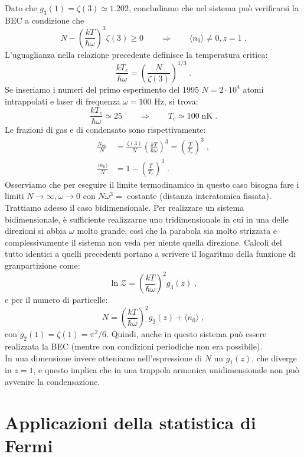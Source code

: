 \documentclass[10pt,a4paper]{report}
\theoremstyle{definition}
\numberwithin{equation}{section}
\newcommand{\bra}{\langle}
\newcommand{\ket}{\rangle}
\newcommand{\zpart}{\mathcal{Z}}
\begin{document}
Dato che $g_3(1)=\zeta(3)\simeq 1.202$, concludiamo che nel sistema può verificarsi la BEC a condizione che
\begin{equation}
N-\left(\frac{kT}{\hbar\omega}\right)^3\zeta(3)\ge 0 \qquad \Longrightarrow\qquad \bra n_0\ket\ne 0, z=1\;.
\end{equation}
L'uguaglianza nella relazione precedente definisce la temperatura critica:
\begin{equation}
\frac{kT_c}{\hbar\omega}=\left(\frac{N}{\zeta(3)}\right)^{1/3}\;.
\end{equation}
Se inseriamo i numeri del primo esperimento del 1995 $N=2\cdot 10^4$ atomi intrappolati e laser di frequenza $\omega=100$ Hz, si trova:
$$
\frac{kT_c}{\hbar\omega}\simeq 25\qquad\Longrightarrow\qquad T_c\simeq 100\;\mathrm{nK}\;.
$$
Le frazioni di gas e di condensato sono rispettivamente:
\begin{align*}
\frac{N_{\mathrm{ex}}}{N}&=\frac{\zeta(3)}{N}\left(\frac{kT}{\hbar\omega}\right)^3=\left(\frac{T}{T_c}\right)^3\;, \\
\frac{\bra n_0\ket}{N} &= 1-\left(\frac{T}{T_c}\right)^3\;.
\end{align*}
Osserviamo che per eseguire il limite termodinamico in questo caso bisogna fare i limiti $N\to\infty,\omega\to 0$ con $N\omega^3=$ costante (distanza interatomica fissata). \\
Trattiamo adesso il caso bidimensionale. Per realizzare un sistema bidimensionale, è sufficiente realizzarne uno tridimensionale in cui in una delle direzioni si abbia $\omega$ molto grande, così che la parabola sia molto strizzata e complessivamente il sistema non veda per niente quella direzione. Calcoli del tutto identici a quelli precedenti portano a scrivere il logaritmo della funzione di granpartizione come:
\begin{equation}
\ln \zpart=\left(\frac{kT}{\hbar\omega}\right)^2g_3(z)\;,
\end{equation}
e per il numero di particelle:
\begin{equation}
N=\left(\frac{kT}{\hbar\omega}\right)^2g_2(z)+\bra n_0\ket\;,
\end{equation}
con $g_2(1)=\zeta(1)=\pi^2/6$. Quindi, anche in questo sistema può essere realizzata la BEC (mentre con condizioni periodiche non era possibile). \\
In una dimensione invece otteniamo nell'espressione di $N$ un $g_1(z)$, che diverge in $z=1$, e questo implica che in una trappola armonica unidimensionale non può avvenire la condensazione.
\chapter{Applicazioni della statistica di Fermi}
\end{document}

